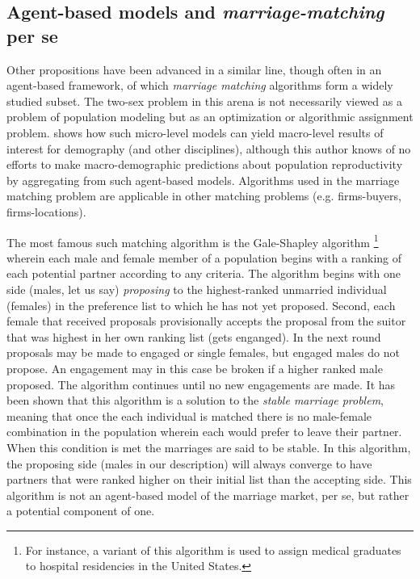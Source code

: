 \subsection{Agent-based models and \textit{marriage-matching} per se} 
Other
propositions have been advanced in a similar line\citep{jacquemet2011marriage, Dagsvik1998report},
though often in an agent-based framework, of which \textit{marriage matching}
 algorithms form a widely studied subset. The two-sex problem in this
arena is not necessarily viewed as a problem of population modeling but as an
optimization or algorithmic assignment problem. \citet{dagsvik2000aggregation}
shows how such micro-level models can yield macro-level results of interest for
demography (and other disciplines), although this author knows of no efforts to
make macro-demographic predictions about population reproductivity by
aggregating from such agent-based models. Algorithms used in 
the marriage matching problem are applicable in other matching problems (e.g.
firms-buyers, firms-locations). 

The most famous such matching algorithm is
the Gale-Shapley algorithm \citep{gale1962college}\footnote{For instance, a variant of this algorithm is used 
to assign medical graduates to hospital residencies in the United States.}
wherein each male and female member of a population begins with a ranking of
each potential partner according to any criteria. The algorithm begins with one
side (males, let us say) \textit{proposing} to the
highest-ranked unmarried individual (females) in the preference list to which
he has not yet proposed. Second, each female that received proposals
provisionally accepts the proposal from the suitor that was highest in her own
ranking list (gets enganged). In the next round proposals may be made to engaged
or single females, but engaged males do not propose. An engagement may in this
case be broken if a higher ranked male proposed. The algorithm continues until
no new engagements are made. It has been shown that this algorithm is a solution
to the \textit{stable marriage problem}, meaning that once the each individual
is matched there is no male-female combination in the population wherein each
would prefer to leave their partner. When this condition is met the marriages
are said to be stable. In this algorithm, the proposing side (males in our
description) will always converge to have partners that were ranked higher on
their initial list than the accepting side. This algorithm is not an agent-based
model of the marriage market, per se, but rather a potential component of one.

